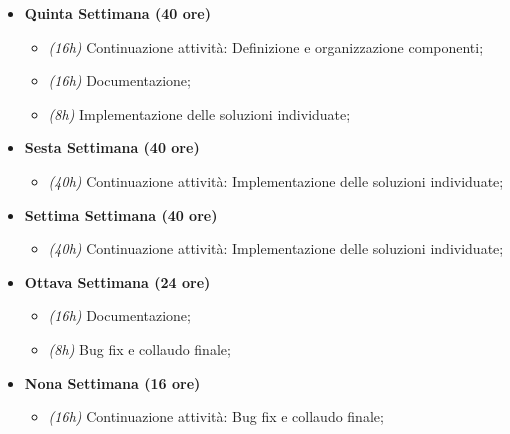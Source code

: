 {\begin{itemize}
\begin{itemize}
        \end{itemize}
        \item \textbf{Quinta Settimana (40 ore)} 
        \begin{itemize}
            \item \textit{(16h)} Continuazione attività: Definizione e organizzazione componenti;
            \item \textit{(16h)} Documentazione;
            \item \textit{(8h)} Implementazione delle soluzioni individuate;
        \end{itemize}
        \item \textbf{Sesta Settimana (40 ore)} 
        \begin{itemize}
            \item \textit{(40h)} Continuazione attività: Implementazione delle soluzioni individuate;
        \end{itemize}
        \item \textbf{Settima Settimana (40 ore)} 
        \begin{itemize}
            \item \textit{(40h)} Continuazione attività: Implementazione delle soluzioni individuate;
        \end{itemize}
        \item \textbf{Ottava Settimana (24 ore)} 
        \begin{itemize}
            \item \textit{(16h)} Documentazione;
            \item \textit{(8h)} Bug fix e collaudo finale;
        \end{itemize}
        \item \textbf{Nona Settimana (16 ore)} 
	    \begin{itemize}
	    	\item \textit{(16h)} Continuazione attività: Bug fix e collaudo finale;
	    \end{itemize}
    \end{itemize}
}

\newcommand{\totaleOre}{320}

\newcommand{\obiettiviObbligatori}{
	 \item \underline{\textit{O01}}: Realizzazione del componente "Hydrogen Custom Logon" per \textit{MacOs Mojave};
	 \item \underline{\textit{O02}}: Realizzazione di un installer del componente per \textit{MacOs Mojave};
	 \item \underline{\textit{O03}}: Documentazione di progetto;
	 
}

